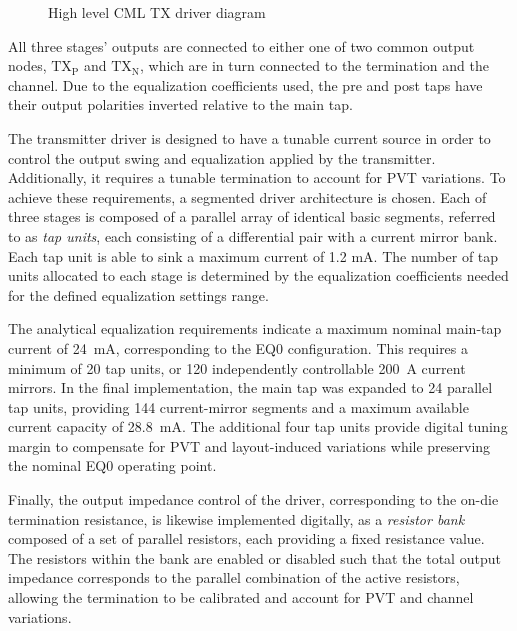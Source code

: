 \begin{figure}[H]
    \caption{High level \ac{CML} \ac{TX} driver diagram} \label{fig:driver_block_diagram}
\end{figure}

All three stages' outputs are connected to either one of two common output nodes, $\mathrm{TX_P}$ and $\mathrm{TX_N}$, which are in turn connected to the termination and the channel. Due to the equalization coefficients used, the pre and post taps have their output polarities inverted relative to the main tap. 

The transmitter driver is designed to have a tunable current source in order to control the output swing and equalization applied by the transmitter. Additionally, it requires a tunable termination to account for \ac{PVT} variations. To achieve these requirements, a segmented driver architecture is chosen. Each of three stages is composed of a parallel array of identical basic segments, referred to as \textit{tap units}, each consisting of a differential pair with a current mirror bank. Each tap unit is able to sink a maximum current of 1.2 mA. The number of tap units allocated to each stage is determined by the equalization coefficients needed for the defined equalization settings range.

The analytical equalization requirements indicate a maximum nominal main-tap current of 24~mA, corresponding to the EQ0 configuration. This requires a minimum of 20 tap units, or 120 independently controllable 200~\textmu A current mirrors. In the final implementation, the main tap was expanded to 24 parallel tap units, providing 144 current-mirror segments and a maximum available current capacity of 28.8~mA. The additional four tap units provide digital tuning margin to compensate for \ac{PVT} and layout-induced variations while preserving the nominal EQ0 operating point.

Finally, the output impedance control of the driver, corresponding to the on-die termination resistance, is likewise implemented digitally, as a \textit{resistor bank} composed of a set of parallel resistors, each providing a fixed resistance value. The resistors within the bank are enabled or disabled such that the total output impedance corresponds to the parallel combination of the active resistors, allowing the termination to be calibrated and account for PVT and channel variations.



